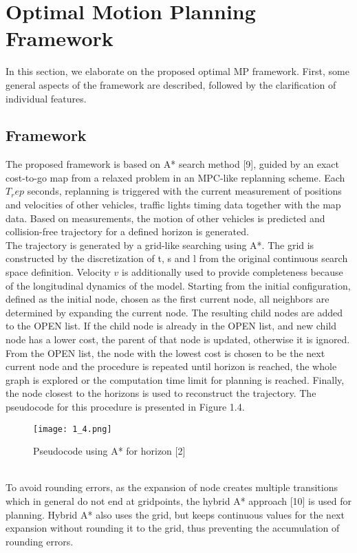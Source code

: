 \documentclass{thesisreport}
\begin{document}
 \section{Optimal Motion Planning Framework}
 In this section, we elaborate on the proposed optimal MP framework. First, some general aspects of the framework are described, followed by the clarification of individual features.
 \subsection{Framework}
 The proposed framework is based on A* search method [9], guided by an exact cost-to-go map from a relaxed problem in an MPC-like replanning scheme. Each $T_rep$ seconds, replanning is triggered with the current measurement of positions and velocities of other vehicles, traffic lights timing data together with the map data. Based on measurements, the motion of other vehicles is predicted and collision-free trajectory for a defined horizon is generated.\\
 \indent
 The trajectory is generated by a grid-like searching using A*. The grid is constructed by the discretization of t, s and l from the original continuous search space definition. Velocity $v$ is additionally used to provide completeness because of the longitudinal dynamics of the model. Starting from the initial configuration, defined as the initial node, chosen as the first current node, all neighbors are determined by expanding the current node. The resulting child nodes are added to the OPEN list. If the child node is already in the OPEN list, and new child node has a lower cost, the parent of that node is updated, otherwise it is ignored. From the OPEN list, the
 node with the lowest cost is chosen to be the next current node and the procedure is repeated until horizon is reached, the whole graph is explored or the computation time limit for planning is reached. Finally, the node closest to the horizons is used to reconstruct the trajectory. The pseudocode for this procedure is presented in Figure 1.4.
   \begin{figure}[ht]
 	\centering
 	\texttt{[image: 1\_4.png]}
 	\caption{Pseudocode using A* for horizon
 		[2]}
 	\label{fig:1.4} 
 \end{figure}\\
\indent
To avoid rounding errors, as the expansion of node creates multiple transitions which in general do not end at gridpoints, the hybrid A* approach [10] is used for planning. Hybrid A* also uses the grid, but keeps continuous values for the next expansion without rounding it to the grid, thus preventing the accumulation of rounding errors.\\
\end{document}
